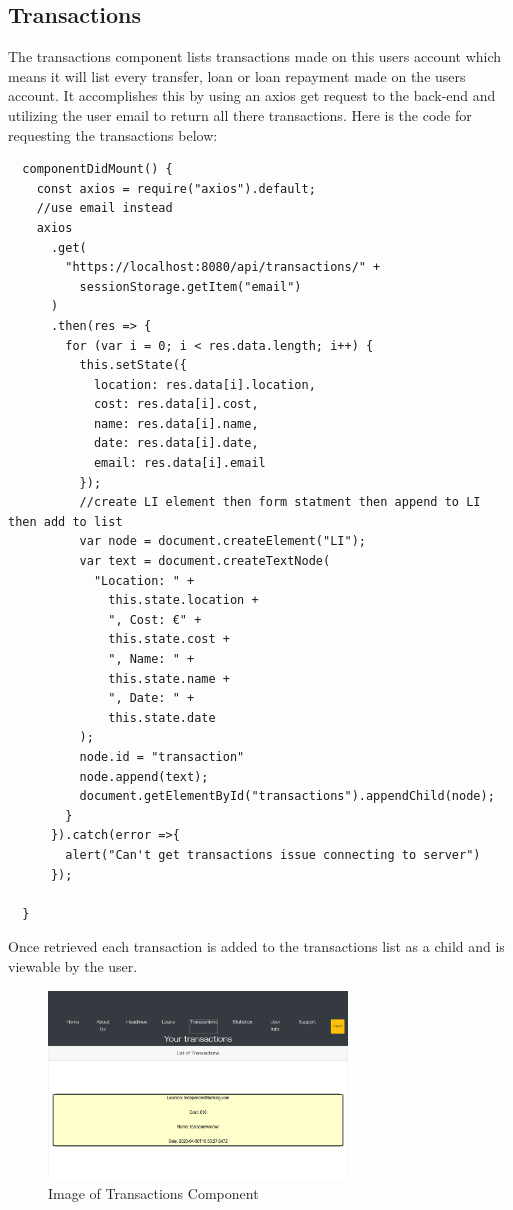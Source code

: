 \subsection{Transactions}
The transactions component lists transactions made on this users account which means it
will list every transfer, loan or loan repayment made on the users account.  It accomplishes
this by using an axios get request to the back-end and utilizing the user email to return all
there transactions.  Here is the code for requesting the transactions below:
\begin{verbatim}
  componentDidMount() {
    const axios = require("axios").default;
    //use email instead
    axios
      .get(
        "https://localhost:8080/api/transactions/" +
          sessionStorage.getItem("email")
      )
      .then(res => {
        for (var i = 0; i < res.data.length; i++) {
          this.setState({
            location: res.data[i].location,
            cost: res.data[i].cost,
            name: res.data[i].name,
            date: res.data[i].date,
            email: res.data[i].email
          });
          //create LI element then form statment then append to LI then add to list
          var node = document.createElement("LI");
          var text = document.createTextNode(
            "Location: " +
              this.state.location +
              ", Cost: €" +
              this.state.cost +
              ", Name: " +
              this.state.name +
              ", Date: " +
              this.state.date
          );
          node.id = "transaction"
          node.append(text);
          document.getElementById("transactions").appendChild(node);
        }
      }).catch(error =>{
        alert("Can't get transactions issue connecting to server")
      });

  }
\end{verbatim}
Once retrieved each transaction is added to the transactions list as a child and is viewable by the user.
\begin{figure}[H]
\includegraphics[width=\textwidth,height=5cm]{img/transactionscomponent.png}
\caption{Image of Transactions Component}
\label{fig:Image of transactions component}
\end{figure}
